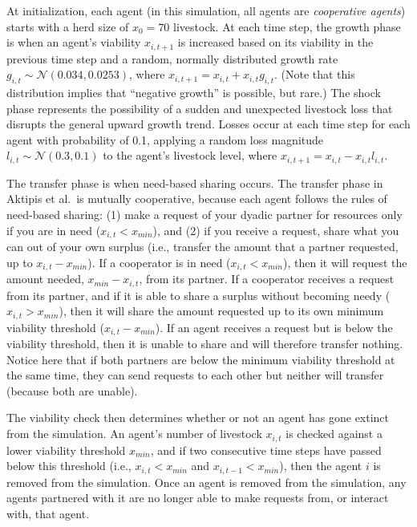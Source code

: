 \documentclass[
]{article}
\begin{document}
At initialization, each agent (in this simulation, all agents are \emph{cooperative agents}) starts with a herd size of \(x_{0}=70\) livestock. At each time step, the growth phase is when an agent's viability \(x_{i,t+1}\) is increased based on its viability in the previous time step and a random, normally distributed growth rate \(g_{i,t} \sim \mathcal{N}(0.034, 0.0253)\), where \(x_{i,t+1} = x_{i,t} + x_{i,t}g_{i,t}\). (Note that this distribution implies that ``negative growth'' is possible, but rare.) The shock phase represents the possibility of a sudden and unexpected livestock loss that disrupts the general upward growth trend. Losses occur at each time step for each agent with probability of 0.1, applying a random loss magnitude \(l_{i,t} \sim \mathcal{N}(0.3, 0.1)\) to the agent's livestock level, where \(x_{i,t+1} =x_{i,t} - x_{i,t}l_{i,t}\).

The transfer phase is when need-based sharing occurs. The transfer phase in Aktipis et al.~is mutually cooperative, because each agent follows the rules of need-based sharing: (1) make a request of your dyadic partner for resources only if you are in need (\(x_{i,t} < x_{min}\)), and (2) if you receive a request, share what you can out of your own surplus (i.e., transfer the amount that a partner requested, up to \(x_{i,t}-x_{min}\)). If a cooperator is in need (\(x_{i,t} < x_{min}\)), then it will request the amount needed, \(x_{min} - x_{i,t}\), from its partner. If a cooperator receives a request from its partner, and if it is able to share a surplus without becoming needy (\(x_{i,t} > x_{min}\)), then it will share the amount requested up to its own minimum viability threshold (\(x_{i,t} - x_{min}\)). If an agent receives a request but is below the viability threshold, then it is unable to share and will therefore transfer nothing. Notice here that if both partners are below the minimum viability threshold at the same time, they can send requests to each other but neither will transfer (because both are unable).

The viability check then determines whether or not an agent has gone extinct from the simulation. An agent's number of livestock \(x_{i,t}\) is checked against a lower viability threshold \(x_{min}\), and if two consecutive time steps have passed below this threshold (i.e., \(x_{i,t} < x_{min}\) and \(x_{i,t-1} < x_{min}\)), then the agent \(i\) is removed from the simulation. Once an agent is removed from the simulation, any agents partnered with it are no longer able to make requests from, or interact with, that agent.
\end{document}
